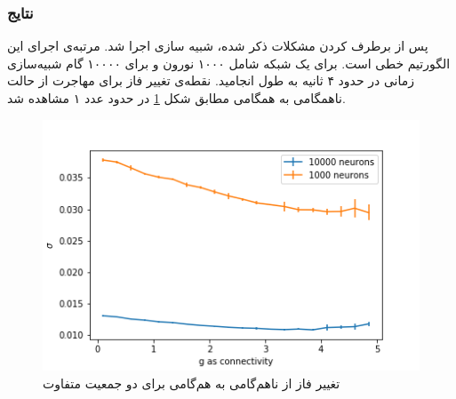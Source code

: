 \documentclass[12pt,onecolumn,a4paper]{article}
\begin{document}
\subsubsection{نتایج }
پس از برطرف کردن مشکلات ذکر شده، شبیه سازی اجرا شد. مرتبه‌ی اجرای این الگورتیم خطی است. برای یک شبکه شامل ۱۰۰۰ نورون و برای ۱۰۰۰۰ گام شبیه‌سازی زمانی در حدود ۴ ثانیه به طول انجامید. نقطه‌ی تغییر فاز برای مهاجرت از حالت ناهمگامی به همگامی مطابق شکل \ref{fig:two_pops_sync_rotational} در حدود عدد ۱ مشاهده شد.\\
\begin{figure}
\centering
  \includegraphics[width = 10 cm]{../scripts/rotational_model/two_pops_sigma.png}
 \caption{تغییر فاز از ناهم‌گامی به هم‌گامی برای دو جمعیت متفاوت}
  \label{fig:two_pops_sync_rotational}
\end{figure}


\newpage


\end{document}
